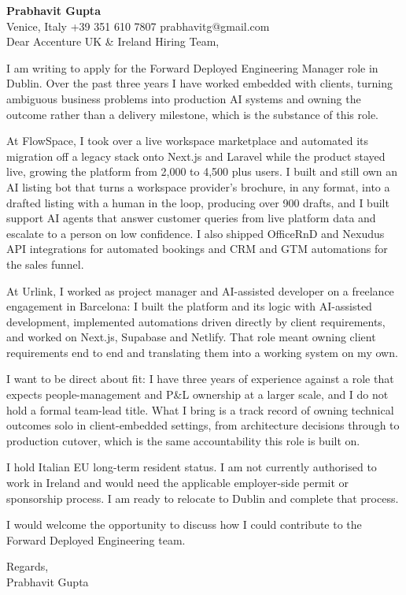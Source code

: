 \documentclass[a4paper,10.5pt]{article}
\begin{document}
\textbf{Prabhavit Gupta}\\
Venice, Italy \textbar{} +39 351 610 7807 \textbar{} prabhavitg@gmail.com\\[10pt]
Dear Accenture UK \& Ireland Hiring Team,

I am writing to apply for the Forward Deployed Engineering Manager role in Dublin. Over the past three years I have worked embedded with clients, turning ambiguous business problems into production AI systems and owning the outcome rather than a delivery milestone, which is the substance of this role.

At FlowSpace, I took over a live workspace marketplace and automated its migration off a legacy stack onto Next.js and Laravel while the product stayed live, growing the platform from 2,000 to 4,500 plus users. I built and still own an AI listing bot that turns a workspace provider's brochure, in any format, into a drafted listing with a human in the loop, producing over 900 drafts, and I built support AI agents that answer customer queries from live platform data and escalate to a person on low confidence. I also shipped OfficeRnD and Nexudus API integrations for automated bookings and CRM and GTM automations for the sales funnel.

At Urlink, I worked as project manager and AI-assisted developer on a freelance engagement in Barcelona: I built the platform and its logic with AI-assisted development, implemented automations driven directly by client requirements, and worked on Next.js, Supabase and Netlify. That role meant owning client requirements end to end and translating them into a working system on my own.

I want to be direct about fit: I have three years of experience against a role that expects people-management and P\&L ownership at a larger scale, and I do not hold a formal team-lead title. What I bring is a track record of owning technical outcomes solo in client-embedded settings, from architecture decisions through to production cutover, which is the same accountability this role is built on.

I hold Italian EU long-term resident status. I am not currently authorised to work in Ireland and would need the applicable employer-side permit or sponsorship process. I am ready to relocate to Dublin and complete that process.

I would welcome the opportunity to discuss how I could contribute to the Forward Deployed Engineering team.

Regards,\\
Prabhavit Gupta
\end{document}
